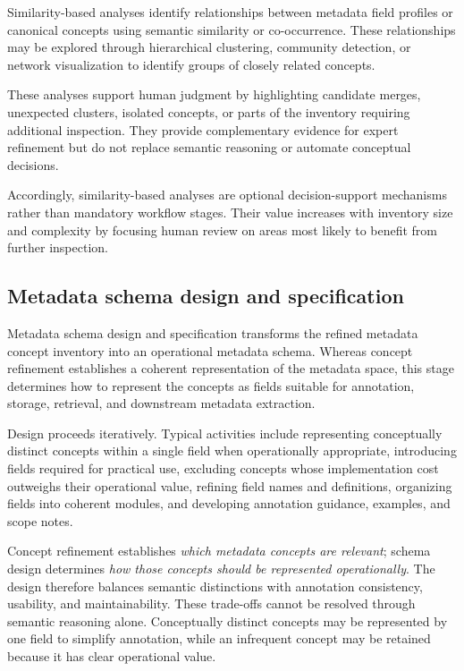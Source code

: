 \documentclass{article}
\begin{document}
Similarity-based analyses identify relationships between metadata field profiles or canonical concepts using semantic similarity or co-occurrence. These relationships may be explored through hierarchical clustering, community detection, or network visualization to identify groups of closely related concepts.

These analyses support human judgment by highlighting candidate merges, unexpected clusters, isolated concepts, or parts of the inventory requiring additional inspection. They provide complementary evidence for expert refinement but do not replace semantic reasoning or automate conceptual decisions.

Accordingly, similarity-based analyses are optional decision-support mechanisms rather than mandatory workflow stages. Their value increases with inventory size and complexity by focusing human review on areas most likely to benefit from further inspection.

\subsection{Metadata schema design and specification}

Metadata schema design and specification transforms the refined metadata concept inventory into an operational metadata schema. Whereas concept refinement establishes a coherent representation of the metadata space, this stage determines how to represent the concepts as fields suitable for annotation, storage, retrieval, and downstream metadata extraction.

Design proceeds iteratively. Typical activities include representing conceptually distinct concepts within a single field when operationally appropriate, introducing fields required for practical use, excluding concepts whose implementation cost outweighs their operational value, refining field names and definitions, organizing fields into coherent modules, and developing annotation guidance, examples, and scope notes.

Concept refinement establishes \emph{which metadata concepts are relevant}; schema design determines \emph{how those concepts should be represented operationally}. The design therefore balances semantic distinctions with annotation consistency, usability, and maintainability. These trade-offs cannot be resolved through semantic reasoning alone. Conceptually distinct concepts may be represented by one field to simplify annotation, while an infrequent concept may be retained because it has clear operational value.
\end{document}
